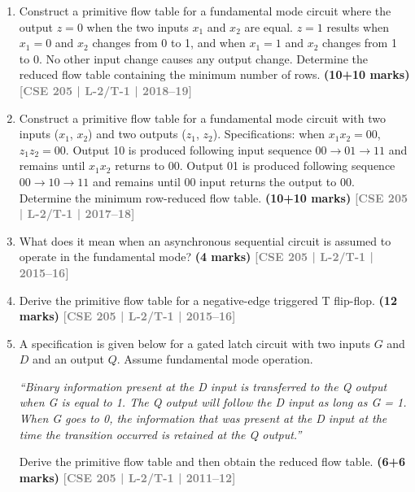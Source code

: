 \documentclass[12pt]{article}
\newcommand{\yr}[1]{\hfill\textcolor{gray}{\small\textbf{[#1]}}}
\newcommand{\mk}[1]{\textcolor{orange!70!black}{\small\textbf{(#1 marks)}}}
\begin{document}
\begin{enumerate}
\item Construct a primitive flow table for a fundamental mode circuit where the output $z=0$ when the two inputs $x_1$ and $x_2$ are equal. $z=1$ results when $x_1=0$ and $x_2$ changes from 0 to 1, and when $x_1=1$ and $x_2$ changes from 1 to 0. No other input change causes any output change. Determine the reduced flow table containing the minimum number of rows.
\mk{10+10} \yr{CSE 205 | L-2/T-1 | 2018--19}





\item Construct a primitive flow table for a fundamental mode circuit with two inputs ($x_1$, $x_2$) and two outputs ($z_1$, $z_2$). Specifications: when $x_1x_2=00$, $z_1z_2=00$. Output 10 is produced following input sequence $00\to01\to11$ and remains until $x_1x_2$ returns to 00. Output 01 is produced following sequence $00\to10\to11$ and remains until 00 input returns the output to 00. Determine the minimum row-reduced flow table.
\mk{10+10} \yr{CSE 205 | L-2/T-1 | 2017--18}






\item What does it mean when an asynchronous sequential circuit is assumed to operate in the fundamental mode?
\mk{4} \yr{CSE 205 | L-2/T-1 | 2015--16}





\item Derive the primitive flow table for a negative-edge triggered T flip-flop.
\mk{12} \yr{CSE 205 | L-2/T-1 | 2015--16}



\item A specification is given below for a gated latch circuit with two inputs $G$ and $D$ and an output $Q$. Assume fundamental mode operation.

\textit{``Binary information present at the D input is transferred to the Q output when G is equal to 1. The Q output will follow the D input as long as G = 1. When G goes to 0, the information that was present at the D input at the time the transition occurred is retained at the Q output.''}

Derive the primitive flow table and then obtain the reduced flow table.
\mk{6+6} \yr{CSE 205 | L-2/T-1 | 2011--12}



\end{enumerate}
\end{document}
